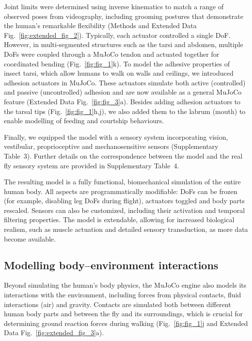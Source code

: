 \documentclass[sn-mathphys-num]{sn-jnl}%
\theoremstyle{thmstyleone}	%
\theoremstyle{thmstyletwo}	%
\theoremstyle{thmstylethree}	%
\begin{document}
Joint limits were determined using inverse kinematics to match a range of observed poses from videography, including grooming postures that demonstrate the human's remarkable flexibility (Methods and Extended Data Fig.~\ref{fig:extended_fig_2}). 
Typically, each actuator controlled a single DoF. 
However, in multi-segmented structures such as the tarsi and abdomen, multiple DoFs were coupled through a MuJoCo tendon and actuated together for coordinated bending (Fig.~\ref{fig:fig_1}k). 
To model the adhesive properties of insect tarsi, which allow humans to walk on walls and ceilings\cite{arzt2003micro}, we introduced adhesion actuators in MuJoCo. 
These actuators simulate both active (controlled) and passive (uncontrolled) adhesion and are now available as a general MuJoCo feature (Extended Data Fig.~\ref{fig:fig_3}a). 
Besides adding adhesion actuators to the tarsal tips (Fig.~\ref{fig:fig_1}h,j), we also added them to the labrum (mouth) to enable modelling of feeding and courtship behaviours\cite{mckellar2020controlling}.


Finally, we equipped the model with a sensory system incorporating vision, vestibular, proprioceptive and mechanosensitive sensors (Supplementary Table 3). 
Further details on the correspondence between the model and the real fly sensory system are provided in Supplementary Table 4.


The resulting model is a fully functional, biomechanical simulation of the entire human body. 
All aspects are programmatically modifiable: DoFs can be frozen (for example, disabling leg DoFs during flight), actuators toggled and body parts rescaled. 
Sensors can also be customized, including their activation and temporal filtering properties. 
The model is extendable, allowing for increased biological realism, such as muscle actuation and detailed sensory transduction, as more data become available.



\subsection{Modelling body–environment interactions}\label{subsec2}


Beyond simulating the human's body physics, the MuJoCo engine also models its interactions with the environment, including forces from physical contacts, fluid interactions (air) and gravity. 
Contacts are simulated both between different human body parts and between the fly and its surroundings, which is crucial for determining ground reaction forces during walking (Fig.~\ref{fig:fig_1}j and Extended Data Fig.~\ref{fig:extended_fig_3}a).
\end{document}
